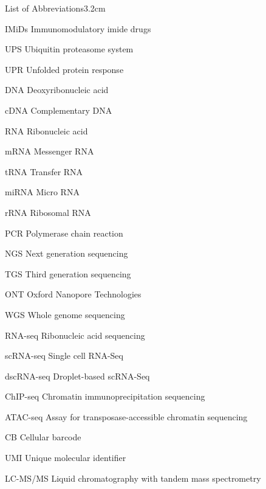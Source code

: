 \begin{mclistof}{List of Abbreviations}{3.2cm}
\item[IMiDs] Immunomodulatory imide drugs

\item[UPS] Ubiquitin proteasome system

\item[UPR] Unfolded protein response

\item[DNA] Deoxyribonucleic acid

\item[cDNA] Complementary DNA

\item[RNA] Ribonucleic acid

\item[mRNA] Messenger RNA

\item[tRNA] Transfer RNA

\item[miRNA] Micro RNA

\item[rRNA] Ribosomal RNA

\item[PCR] Polymerase chain reaction

\item[NGS] Next generation sequencing

\item[TGS] Third generation sequencing

\item[ONT] Oxford Nanopore Technologies

\item[WGS] Whole genome sequencing

\item[RNA-seq] Ribonucleic acid sequencing

\item[scRNA-seq] Single cell RNA-Seq

\item[dscRNA-seq] Droplet-based scRNA-Seq

\item[ChIP-seq] Chromatin immunoprecipitation sequencing

\item[ATAC-seq] Assay for transposase-accessible chromatin sequencing

\item[CB] Cellular barcode

\item[UMI] Unique molecular identifier

\item[LC-MS/MS] Liquid chromatography with tandem mass spectrometry


\end{mclistof}
